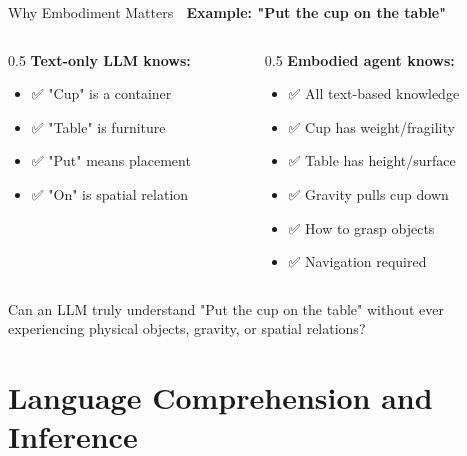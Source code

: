 \documentclass[aspectratio=169]{beamer}
\begin{document}
\begin{frame}[shrink=10]{Why Embodiment Matters 🤖}
\small
    \textbf{Example: "Put the cup on the table"}

    \vspace{0.3cm}

    \begin{columns}[T]
        \begin{column}{0.5\textwidth}
            \textbf{Text-only LLM knows:}
            \begin{itemize}\setlength{\itemsep}{0pt}
                \item ✅ "Cup" is a container
                \item ✅ "Table" is furniture
                \item ✅ "Put" means placement
                \item ✅ "On" is spatial relation
            \end{itemize}
        \end{column}

        \begin{column}{0.5\textwidth}
            \textbf{Embodied agent knows:}
            \begin{itemize}\setlength{\itemsep}{0pt}
                \item ✅ All text-based knowledge
                \item ✅ Cup has weight/fragility
                \item ✅ Table has height/surface
                \item ✅ Gravity pulls cup down
                \item ✅ How to grasp objects
                \item ✅ Navigation required
            \end{itemize}
        \end{column}
    \end{columns}

    \vspace{0.3cm}

    \begin{discussion}
        Can an LLM truly understand "Put the cup on the table" without ever experiencing physical objects, gravity, or spatial relations?
    \end{discussion}
\end{frame}

\section{Language Comprehension and Inference}
\end{document}
